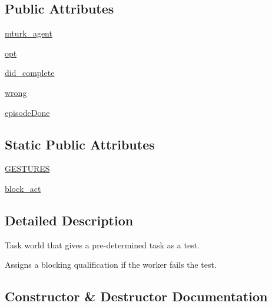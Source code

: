 \subsection*{Public Attributes}
\begin{DoxyCompactItemize}
\item 
\hyperlink{classlight__chat__eval_1_1worlds_1_1LightEvalTestWorld_a4d4fdebfcb25486f1ef39d349aee472d}{mturk\+\_\+agent}
\item 
\hyperlink{classlight__chat__eval_1_1worlds_1_1LightEvalTestWorld_af30a480a616bdff00533b91ea3bbb5ce}{opt}
\item 
\hyperlink{classlight__chat__eval_1_1worlds_1_1LightEvalTestWorld_afe28ccafcf819129c3d98b19a5002a31}{did\+\_\+complete}
\item 
\hyperlink{classlight__chat__eval_1_1worlds_1_1LightEvalTestWorld_ac3f300a69906b04a0f0372712b3ae8ef}{wrong}
\item 
\hyperlink{classlight__chat__eval_1_1worlds_1_1LightEvalTestWorld_ac20e00446776ea56707bc1e98a52ce35}{episode\+Done}
\end{DoxyCompactItemize}
\subsection*{Static Public Attributes}
\begin{DoxyCompactItemize}
\item 
\hyperlink{classlight__chat__eval_1_1worlds_1_1LightEvalTestWorld_aa52cfc2c62b730cf0240a26dacfe14e9}{G\+E\+S\+T\+U\+R\+ES}
\item 
\hyperlink{classlight__chat__eval_1_1worlds_1_1LightEvalTestWorld_af50e5abf74c553f1bcefd375f809560b}{block\+\_\+act}
\end{DoxyCompactItemize}


\subsection{Detailed Description}
\begin{DoxyVerb}Task world that gives a pre-determined task as a test.

Assigns a blocking qualification if the worker fails the test.
\end{DoxyVerb}
 

\subsection{Constructor \& Destructor Documentation}
\mbox{\label{classlight__chat__eval_1_1worlds_1_1LightEvalTestWorld_abe875bf151cf111e838b6844d08620e1}} 
